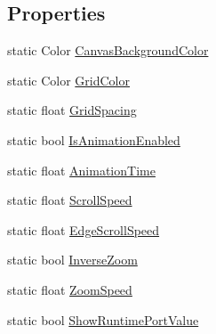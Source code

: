 \subsection*{Properties}
\begin{DoxyCompactItemize}
\item 
static Color \hyperlink{classi_c_s___preferences_controller_ac3efcc0eb01719b770bfae84bfad6d21}{Canvas\+Background\+Color}
\item 
static Color \hyperlink{classi_c_s___preferences_controller_a2cc29670a09e851f35c695810a3d0a73}{Grid\+Color}
\item 
static float \hyperlink{classi_c_s___preferences_controller_a470865cb7f7c1d59f318355eee94d551}{Grid\+Spacing}
\item 
static bool \hyperlink{classi_c_s___preferences_controller_a039d0d69d4c26caaebed6d6006cea643}{Is\+Animation\+Enabled}
\item 
static float \hyperlink{classi_c_s___preferences_controller_a485a27768452170ca90d24bb5f3d6f9b}{Animation\+Time}
\item 
static float \hyperlink{classi_c_s___preferences_controller_ad3de9b6d316d11ad5223c2a0a747d730}{Scroll\+Speed}
\item 
static float \hyperlink{classi_c_s___preferences_controller_aa8132d06a33cbcb6e07e2054858bb260}{Edge\+Scroll\+Speed}
\item 
static bool \hyperlink{classi_c_s___preferences_controller_ab8ce5f3533cc8002a269e3c62c90ea5c}{Inverse\+Zoom}
\item 
static float \hyperlink{classi_c_s___preferences_controller_a8b3f2a181182a40312d08314411dacb6}{Zoom\+Speed}
\item 
static bool \hyperlink{classi_c_s___preferences_controller_a33ed327093e8ae9137c4f4e27f1e09a3}{Show\+Runtime\+Port\+Value}

\end{DoxyCompactItemize}
